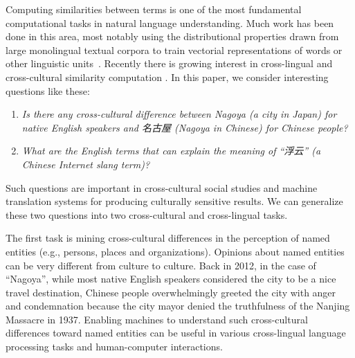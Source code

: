 Computing similarities between terms is one of the most fundamental
computational tasks in natural language understanding. Much work has been done
in this area, most notably using the distributional properties drawn from large monolingual textual
corpora to train vectorial representations of words or other 
linguistic units~\cite{Bengio2000ANP,pennington2014glove,Le2014DistributedRO}. 
Recently there is growing interest in cross-lingual and cross-cultural similarity computation \cite{luong2015bilingual,Garimella2016IdentifyingCD,camacho2017semeval}.
In this paper, we consider interesting questions like these:
\begin{enumerate}
\item {\em Is there any cross-cultural difference between Nagoya 
(a city in Japan) for native English speakers and 名古屋 (Nagoya in Chinese) for Chinese people?}
\item {\em What are the English terms that can explain the meaning of ``浮云'' (a Chinese Internet slang term)?}
\end{enumerate}
Such questions are important in cross-cultural social studies 
and machine translation systems for producing culturally sensitive results.  
We can generalize these two questions into two
cross-cultural and cross-lingual tasks.  

The first task is mining cross-cultural differences in
the perception of named entities (e.g., persons, places and organizations). 
Opinions about named entities can be very different from culture to culture. 
Back in 2012, in the case of ``Nagoya'', while most native English speakers considered 
the city to be a nice travel destination, 
Chinese people overwhelmingly greeted the city with anger and 
condemnation because the city mayor denied the
truthfulness of the Nanjing Massacre in 1937. 
Enabling machines to understand
such cross-cultural differences toward named entities can be useful in various
cross-lingual language processing tasks and human-computer interactions.

